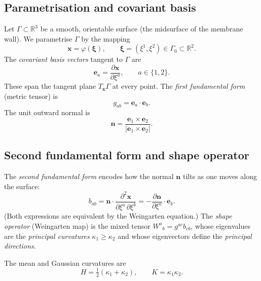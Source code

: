 \documentclass[11pt]{article}
\newcommand{\vv}[1]{\bm{#1}}          %
\newcommand{\nn}{\vv{n}}               %
\newcommand{\kone}{\kappa_1}
\newcommand{\ktwo}{\kappa_2}
\newcommand{\Hmean}{H}
\newcommand{\Kgauss}{K}
\newcommand{\R}{\mathbb{R}}
\begin{document}
\subsection{Parametrisation and covariant basis}

Let $\Gamma\subset\R^3$ be a smooth, orientable surface (the midsurface of the
membrane wall).  We parametrise $\Gamma$ by the mapping
\begin{equation}
  \vv{x} = \varphi(\bm{\xi}), \qquad \bm{\xi}=(\xi^1,\xi^2)\in\Gamma_0\subset\R^2.
  \label{eq:param}
\end{equation}
The \emph{covariant basis vectors} tangent to $\Gamma$ are
\begin{equation}
  \vv{e}_a = \frac{\partial\vv{x}}{\partial\xi^a}, \qquad a\in\{1,2\}.
  \label{eq:cov-basis}
\end{equation}
These span the tangent plane $T_{\vv x}\Gamma$ at every point.  The
\emph{first fundamental form} (metric tensor) is
\begin{equation}
  g_{ab} = \vv{e}_a\cdot\vv{e}_b.
  \label{eq:metric}
\end{equation}
The unit outward normal is
\begin{equation}
  \nn = \frac{\vv{e}_1\times\vv{e}_2}{|\vv{e}_1\times\vv{e}_2|}.
  \label{eq:normal}
\end{equation}

\subsection{Second fundamental form and shape operator}

The \emph{second fundamental form} encodes how the normal $\nn$ tilts as one
moves along the surface:
\begin{equation}
  b_{ab} = \nn\cdot\frac{\partial^2\vv{x}}{\partial\xi^a\,\partial\xi^b}
          = -\frac{\partial\nn}{\partial\xi^a}\cdot\vv{e}_b.
  \label{eq:IIF}
\end{equation}
(Both expressions are equivalent by the Weingarten equation.)
The \emph{shape operator} (Weingarten map) is the mixed tensor
$W^a{}_b = g^{ac}b_{cb}$, whose eigenvalues are the \emph{principal curvatures}
$\kone\ge\ktwo$ and whose eigenvectors define the \emph{principal directions}.

The mean and Gaussian curvatures are
\begin{equation}
  \Hmean = \tfrac12(\kone+\ktwo), \qquad
  \Kgauss = \kone\ktwo.
  \label{eq:HK}
\end{equation}
\end{document}
